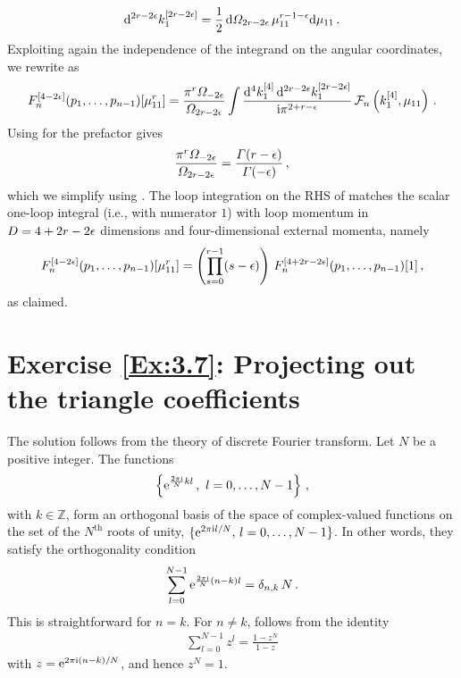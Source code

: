 \begin{align}
\d^{2r - 2\eps} k_1^{[2r - 2\eps]} = \frac{1}{2} \, \d \Omega_{2r-2\eps} \, \mu_{11}^{r-1-\eps} \d \mu_{11} \,.
\end{align}
Exploiting again the independence of the integrand on the angular coordinates, we rewrite  as
\begin{align} \label{eq:dimshift_eq3}
F^{[4-2\eps]}_n(p_1,\ldots,p_{n-1})[\mu_{11}^r] = \frac{\pi^r \Omega_{-2\eps}}{\Omega_{2 r-2\eps}} 
  \int \frac{ \d^{4} k_1^{[4]} \,  \d^{2r-2\eps} k_1^{[2r-2\eps]} }{\i \pi^{2+r-\eps}}  \, \mathcal{F}_n\left( k_1^{[4]}, \mu_{11} \right) \,.
\end{align}
Using  for the prefactor gives
\begin{align}
\frac{\pi^r \Omega_{-2\eps}}{\Omega_{2 r-2\eps}} = \frac{\Gamma(r-\eps)}{\Gamma(-\eps)}  \,,
\end{align}
which we simplify using . The loop integration on the RHS of  matches the scalar one-loop integral (i.e., with numerator $1$) with loop momentum in $D=4+2r - 2\epsilon$ dimensions and four-dimensional external momenta, namely
\begin{align}
F_n^{[4-2\epsilon]}(p_1,\ldots,p_{n-1})[\mu_{11}^r] = \left( \prod_{s=0}^{r-1}(s-\epsilon) \right) \, F_{n}^{[4+2 r - 2\epsilon]}(p_1,\ldots,p_{n-1})[1] \,,
\end{align}
as claimed.


\section*{Exercise \ref{Ex:3.7}: Projecting out the triangle coefficients}
\label{Sol:3.7}

The solution follows from the theory of discrete Fourier transform. Let $N$ be a positive integer.
The functions
\begin{align}
\left\{\text{e}^{\frac{2 \pi \mathrm{i}}{N} k l}\,, \ l = 0,\ldots, N-1 \right\} \,,
\end{align}
with $k\in \mathbb{Z}$, form an orthogonal basis of the space of complex-valued functions on the set of the $N^{\text{th}}$ roots of unity, $\{ \text{e}^{2\pi\mathrm{i} l/N}, \, l=0,\ldots,N-1\}$. In other words, they satisfy the orthogonality condition
\begin{align} \label{eq:orthogonality}
\sum_{l=0}^{N-1} \text{e}^{\frac{2\pi\mathrm{i}}{N} (n-k) l} = \delta_{n,k} \, N \,.
\end{align}
This is straightforward for $n=k$. For $n\neq k$,  follows from the identity
\begin{align}
\sum_{l=0}^{N-1} z^l = \frac{1-z^N}{1-z}  
\end{align}
with $z = \text{e}^{2\pi\mathrm{i} (n-k)/N}$, and hence $z^N = 1$.

